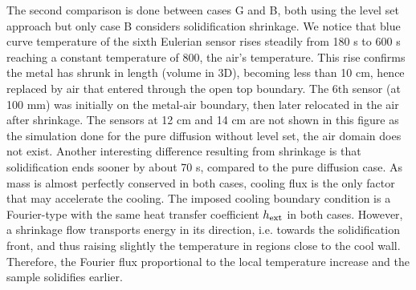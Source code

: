 The second comparison is done between cases G and B, both using the level set approach but only case B considers solidification shrinkage.
We notice that blue curve temperature of the sixth 
Eulerian sensor rises steadily from 180 s to 600 s reaching a constant temperature of \SI{800}{\udegC}, the air's temperature. 
This rise confirms the metal has shrunk in length (volume in 3D),
becoming less than 10 cm, hence replaced by air that entered through the open top boundary.
The 6$\text{th}$ sensor (at 100 mm) was initially on the metal-air boundary, then later relocated in the air after shrinkage.
The sensors at 12 cm and 14 cm are not shown in this figure as the simulation done for the pure diffusion without level set, the air domain does not exist.
Another interesting difference resulting from shrinkage is that solidification ends sooner by about 70 s, compared to the pure diffusion case.
As mass is almost perfectly conserved in both cases, cooling flux is the only factor that may accelerate the cooling. The imposed cooling boundary condition
is a Fourier-type with the same heat transfer coefficient $h_{\text{ext}}$ in both cases. However, a shrinkage flow transports energy in its direction, i.e. towards the solidification
front, and thus raising slightly the temperature in regions close to the cool wall. Therefore, the Fourier flux proportional to the local temperature
increase and the sample solidifies earlier. 

